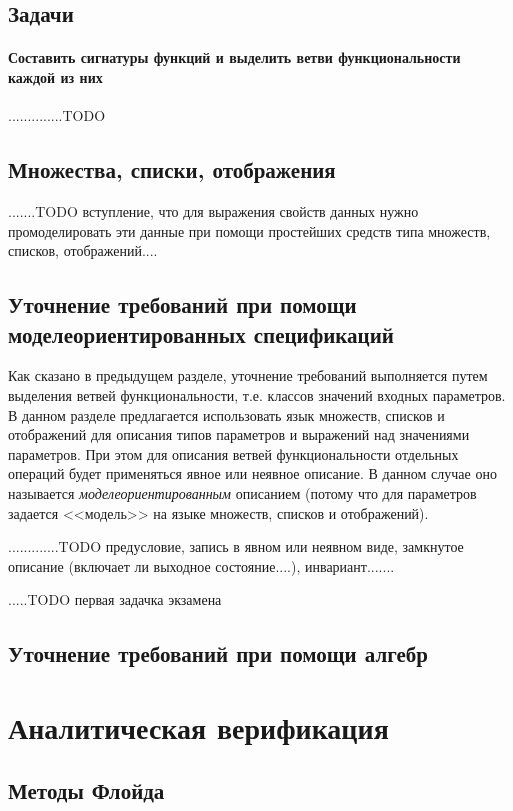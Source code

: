 \documentclass[14pt, twoside]{extreport}
\newcounter{problem_type}[chapter]
\newcommand{\head}[1]{\vspace{1cm}\subsubsection*{#1}}
\newcommand{\zhead}[1]{\head{#1} \refstepcounter{problem_type}}
\begin{document}
\section*{Задачи}

\zhead{Составить сигнатуры функций и выделить ветви функциональности каждой из них}

..............TODO


\section{Множества, списки, отображения}

.......TODO вступление, что для выражения свойств данных нужно промоделировать эти данные при помощи простейших средств типа множеств, списков, отображений....


\section{Уточнение требований при помощи моделеориентированных спецификаций}

Как сказано в предыдущем разделе, уточнение требований выполняется путем выделения ветвей функциональности, т.е. классов значений входных параметров. В данном разделе предлагается использовать язык множеств, списков и отображений для описания типов параметров и выражений над значениями параметров. При этом для описания ветвей функциональности отдельных операций будет применяться явное или неявное описание. В данном случае оно называется \emph{моделеориентированным} описанием (потому что для параметров задается <<модель>> на языке множеств, списков и отображений).


.............TODO предусловие, запись в явном или неявном виде, замкнутое описание (включает ли выходное состояние....), инвариант.......

.....TODO первая задачка экзамена


\section{Уточнение требований при помощи алгебр}


\chapter{Аналитическая верификация}

\section{Методы Флойда}
\end{document}
